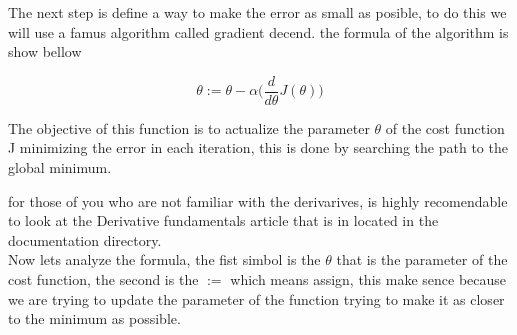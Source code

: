 \documentclass[12pt,journal]{IEEEtran}
\begin{document}
    The next step is define a way to make the error as small as posible,
    to do this we will use a famus algorithm called gradient decend.
    the formula of the algorithm is show bellow

    \begin{equation}
        \theta := \theta - \alpha
            \Bigg(
                \frac{d}{d \theta} J(\theta)
            \Bigg)
    \end{equation}

    The objective of this function is to actualize the parameter $\theta$
    of the cost function J minimizing the error in each iteration, this
    is done by searching the path to the global minimum.

    for those of you who are not familiar with the derivarives, is highly
    recomendable to look at the Derivative fundamentals article that is in
    located in the documentation directory.\\

    Now lets analyze the formula, the fist simbol is the $\theta$ that is the
    parameter of the cost function, the second is the $:=$ which means assign,
    this make sence because we are trying to update the parameter of the
    function trying to make it as closer to the minimum as possible.

    \begin{figure}[ht!]
    \end{figure}
\end{document}
